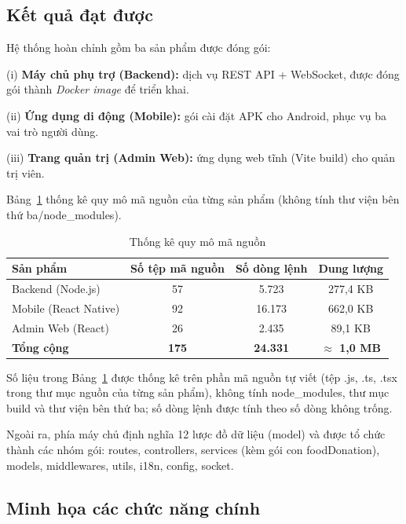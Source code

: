 \documentclass[../main.tex]{subfiles}%
\begin{document}
\subsection{Kết quả đạt được}
\label{subsection:4.3.2}

Hệ thống hoàn chỉnh gồm ba sản phẩm được đóng gói:

(i) \textbf{Máy chủ phụ trợ (Backend):} dịch vụ REST API + WebSocket, được đóng gói thành \textit{Docker image} để triển khai.
  
(ii) \textbf{Ứng dụng di động (Mobile):} gói cài đặt APK cho Android, phục vụ ba vai trò người dùng.

(iii) \textbf{Trang quản trị (Admin Web):} ứng dụng web tĩnh (Vite build) cho quản trị viên.

Bảng~\ref{tab:thong_ke} thống kê quy mô mã nguồn của từng sản phẩm (không tính thư viện bên thứ ba/node\_modules).

\begin{table}[H]
\centering
\renewcommand{\arraystretch}{1.25}
\begin{tabular}{|l|c|c|c|}
\hline
\textbf{Sản phẩm} & \textbf{Số tệp mã nguồn} & \textbf{Số dòng lệnh} & \textbf{Dung lượng} \\ \hline
Backend (Node.js)        & 57  & 5.723  & 277,4 KB \\ \hline
Mobile (React Native)    & 92  & 16.173 & 662,0 KB \\ \hline
Admin Web (React)        & 26  & 2.435  & 89,1 KB \\ \hline
\textbf{Tổng cộng}       & \textbf{175} & \textbf{24.331} & \textbf{$\approx$ 1,0 MB} \\ \hline
\end{tabular}
\caption{Thống kê quy mô mã nguồn}
\label{tab:thong_ke}
\end{table}

Số liệu trong Bảng~\ref{tab:thong_ke} được thống kê trên phần mã nguồn tự viết (tệp .js, .ts, .tsx trong thư mục nguồn của từng sản phẩm), không tính node\_modules, thư mục build và thư viện bên thứ ba; số dòng lệnh được tính theo số dòng không trống.

Ngoài ra, phía máy chủ định nghĩa 12 lược đồ dữ liệu (model) và được tổ chức thành các nhóm gói: routes, controllers, services (kèm gói con foodDonation), models, middlewares, utils, i18n, config, socket.

\subsection{Minh họa các chức năng chính}
\label{subsection:4.3.3}
\end{document}
